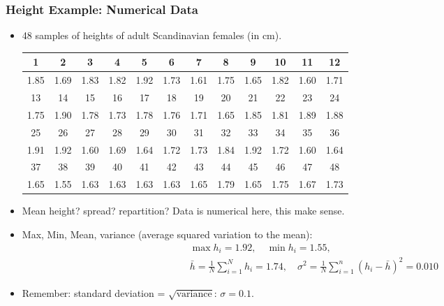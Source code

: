\documentclass[9pt]{beamer}
\begin{document}
\begin{frame}
  \frametitle{Height Example: Numerical Data}
    \begin{itemize}
    \item 48 samples of heights of adult Scandinavian females (in cm).
      \begin{center}
        {\tiny
          \begin{tabular}[h]{|c|c|c|c|c|c|c|c|c|c|c|c|}
            \hline
            1 & 2 & 3 & 4 & 5 & 6 & 7 & 8 & 9 & 10 & 11 & 12\\\hline
            1.85 & 1.69 & 1.83 & 1.82 & 1.92 & 1.73 & 1.61 & 1.75 & 1.65 & 1.82 & 1.60 & 1.71
            \\\hhline{============}
            13 & 14 & 15 & 16 & 17 & 18 & 19 & 20 & 21 & 22 & 23 & 24\\\hline
            1.75 & 1.90 & 1.78 & 1.73 & 1.78 & 1.76 & 1.71 & 1.65 & 1.85 & 1.81 & 1.89 & 1.88
            \\\hhline{============}
            25 & 26 & 27 & 28 & 29 & 30 & 31 & 32 & 33 & 34 & 35 & 36\\\hline
            1.91 & 1.92 & 1.60 & 1.69 & 1.64 & 1.72 & 1.73 & 1.84 & 1.92 & 1.72 & 1.60 & 1.64
            \\\hhline{============}
            37 & 38 & 39 & 40 & 41 & 42 & 43 & 44 & 45 & 46 & 47 & 48\\\hline
            1.65 & 1.55 & 1.63 & 1.63 & 1.63 & 1.63 & 1.65 & 1.79 & 1.65 & 1.75 & 1.67 & 1.73
            \\\hline
          \end{tabular}
        }
      \end{center}
    \item Mean height? spread? repartition? Data is numerical here, this make sense.
    \item Max, Min, Mean, variance (average squared variation to the mean):
      \begin{align*}
        &\max h_i = 1.92,\quad\min h_i = 1.55,&\\
      &\bar{h} = \frac{1}{N}\sum_{i=1}^Nh_i = 1.74,\quad \sigma^2 =
      \frac{1}{N}\sum_{i=1}^n\left(h_i-\bar{h}\right)^2 = 0.010&
    \end{align*}
  \item Remember: standard deviation = $\sqrt{\text{variance}}$: $\sigma = 0.1$.
  \end{itemize}
\end{frame}
\end{document}
